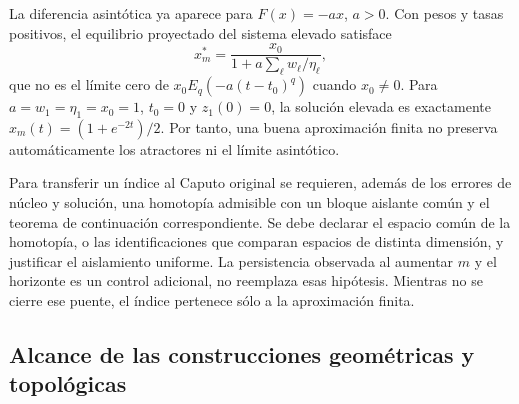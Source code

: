 La diferencia asintótica ya aparece para $F(x)=-ax$, $a>0$. Con pesos y tasas
positivos, el equilibrio proyectado del sistema elevado satisface
\[
 x_m^*=\frac{x_0}{1+a\sum_\ell w_\ell/\eta_\ell},
\]
que no es el límite cero de $x_0E_q(-a(t-t_0)^q)$ cuando $x_0\ne0$.
Para $a=w_1=\eta_1=x_0=1$, $t_0=0$ y $z_1(0)=0$, la solución elevada es
exactamente $x_m(t)=(1+e^{-2t})/2$. Por tanto, una buena aproximación finita
no preserva automáticamente los atractores ni el límite asintótico.

Para transferir un índice al Caputo original se requieren, además de los
errores de núcleo y solución, una homotopía admisible con un bloque aislante
común y el teorema de continuación correspondiente. Se debe declarar el
espacio común de la homotopía, o las identificaciones que comparan espacios
de distinta dimensión, y justificar el aislamiento uniforme. La persistencia
observada al aumentar $m$ y el horizonte es un control adicional, no reemplaza
esas hipótesis. Mientras no se cierre ese puente, el índice pertenece sólo
a la aproximación finita.

\subsection{Alcance de las construcciones geométricas y topológicas}
\label{subsec:gt-novelty-map}

